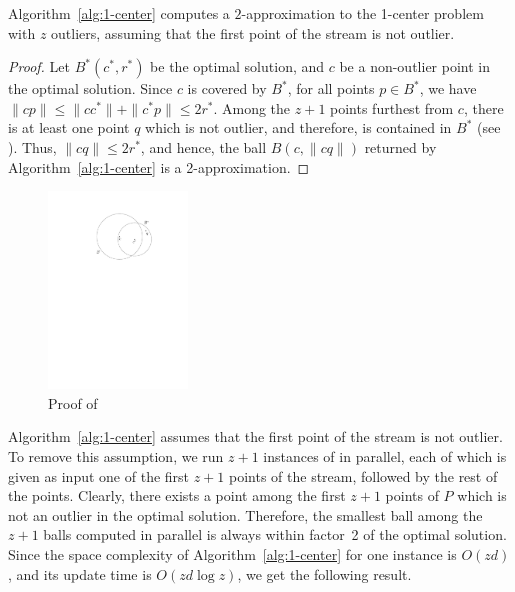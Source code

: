 \documentclass[envcountsame]{cls/cccg15}
\renewcommand{\O}{\ensuremath{{O}}}
\newcommand{\len}[1]{\|{#1}\|}
\newcommand{\lee}{\leqslant}
\renewcommand{\le}{\lee}
\begin{document}
\begin{theorem} \label{thm:1-center}
	Algorithm~\ref{alg:1-center} computes a $2$-approximation to
	the 1-center problem with $z$ outliers,
	assuming that the first point of the stream is not outlier. 
\end{theorem}


\begin{proof}
Let $B^*(c^*, r^*)$ be the optimal solution,
and $c$ be a non-outlier point in the optimal solution.
Since $c$ is covered by $B^*$,
for all points $p \in B^*$, we have
$\len{cp} \le \len{cc^*} + \len{c^*p} \le 2r^*$.
Among the $z+1$ points furthest from $c$,
there is at least one point $q$ which is not outlier, %
and therefore, is contained in $B^*$
(see ). 
Thus, $\len{cq} \le 2r^*$,
and hence, the ball $B(c, \len{cq})$ returned by Algorithm~\ref{alg:1-center} 
is a 2-approximation. 
\end{proof}


\begin{figure}[t]
	\centering
	\includegraphics[width=10em]{figs/one-center}
	\caption{Proof of }
	\label{fig:1center}
\end{figure}


\noindent
Algorithm~\ref{alg:1-center} 
assumes that the first point of the stream is not outlier.
To remove this assumption,
we run $z+1$ instances of  in parallel,
each of which is given as input one of the first $z + 1$ points of the stream,
followed by the rest of the points.
Clearly, there exists a point among the first $z+1$ points of $P$
which is not an outlier in the optimal solution.
Therefore, the smallest ball among the $z+1$ balls computed in parallel
is always within factor~2 of the optimal solution. %
Since the space complexity of Algorithm~\ref{alg:1-center} for one instance is $\O(zd)$, 
and its update time is $\O (zd \log z)$, %
we get the following result.
\end{document}
